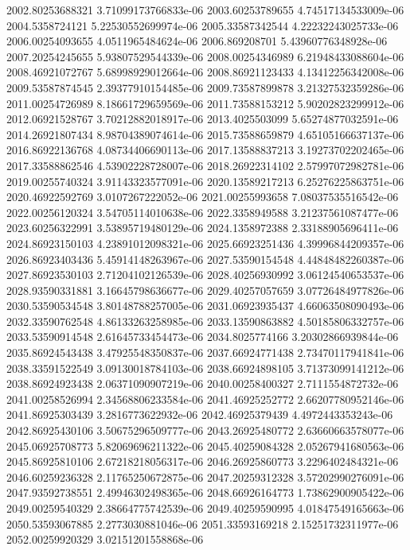 {2002.80253688321 3.71099173766833e-06
2003.60253789655 4.74517134533009e-06
2004.5358724121 5.22530552699974e-06
2005.33587342544 4.22232243025733e-06
2006.00254093655 4.0511965484624e-06
2006.869208701 5.43960776348928e-06
2007.20254245655 5.93807529544339e-06
2008.00254346989 6.21948433088604e-06
2008.46921072767 5.68998929012664e-06
2008.86921123433 4.13412256342008e-06
2009.53587874545 2.39377910154485e-06
2009.73587899878 3.21327532359286e-06
2011.00254726989 8.18661729659569e-06
2011.73588153212 5.90202823299912e-06
2012.06921528767 3.70212882018917e-06
2013.4025503099 5.65274877032591e-06
2014.26921807434 8.98704389074614e-06
2015.73588659879 4.65105166637137e-06
2016.86922136768 4.08734406690113e-06
2017.13588837213 3.19273702202465e-06
2017.33588862546 4.53902228728007e-06
2018.26922314102 2.57997072982781e-06
2019.00255740324 3.91143323577091e-06
2020.13589217213 6.25276225863751e-06
2020.46922592769 3.0107267222052e-06
2021.00255993658 7.08037535516542e-06
2022.00256120324 3.54705114010638e-06
2022.3358949588 3.21237561087477e-06
2023.60256322991 3.53895719480129e-06
2024.1358972388 2.33188905696411e-06
2024.86923150103 4.23891012098321e-06
2025.66923251436 4.39996844209357e-06
2026.86923403436 5.45914148263967e-06
2027.53590154548 4.44848482260387e-06
2027.86923530103 2.71204102126539e-06
2028.40256930992 3.06124540653537e-06
2028.93590331881 3.16645798636677e-06
2029.40257057659 3.07726484977826e-06
2030.53590534548 3.80148788257005e-06
2031.06923935437 4.66063508090493e-06
2032.33590762548 4.86133263258985e-06
2033.13590863882 4.50185806332757e-06
2033.53590914548 2.61645733454473e-06
2034.8025774166 3.20302866939844e-06
2035.86924543438 3.47925548350837e-06
2037.66924771438 2.73470117941841e-06
2038.33591522549 3.09130018784103e-06
2038.66924898105 3.71373099141212e-06
2038.86924923438 2.06371090907219e-06
2040.00258400327 2.7111554872732e-06
2041.00258526994 2.34568806233584e-06
2041.46925252772 2.66207780952146e-06
2041.86925303439 3.2816773622932e-06
2042.46925379439 4.4972443353243e-06
2042.86925430106 3.50675296509777e-06
2043.26925480772 2.63660663578077e-06
2045.06925708773 5.82069696211322e-06
2045.40259084328 2.05267941680563e-06
2045.86925810106 2.67218218056317e-06
2046.26925860773 3.2296402484321e-06
2046.60259236328 2.11765250672875e-06
2047.20259312328 3.57202990276091e-06
2047.93592738551 2.49946302498365e-06
2048.66926164773 1.73862900905422e-06
2049.00259540329 2.38664775742539e-06
2049.40259590995 4.01847549165663e-06
2050.53593067885 2.2773030881046e-06
2051.33593169218 2.15251732311977e-06
2052.00259920329 3.02151201558868e-06
}
